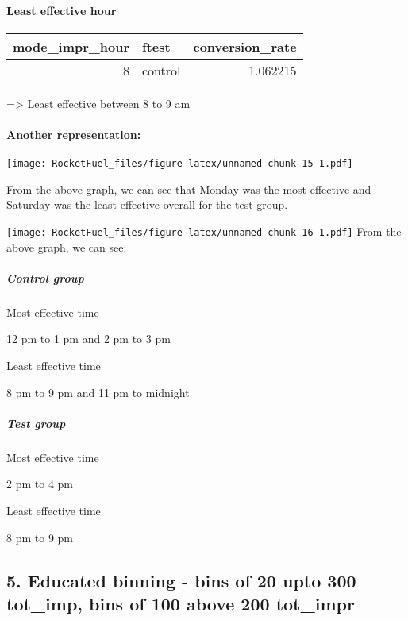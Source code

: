 \documentclass[
]{article}
\begin{document}
\hypertarget{least-effective-hour}{%
\paragraph{Least effective hour}\label{least-effective-hour}}

\begin{longtable}[]{@{}rlr@{}}
\toprule
mode\_impr\_hour & ftest & conversion\_rate\tabularnewline
\midrule
\endhead
8 & control & 1.062215\tabularnewline
\bottomrule
\end{longtable}

=\textgreater{} Least effective between 8 to 9 am

\hypertarget{another-representation}{%
\paragraph{Another representation:}\label{another-representation}}

\texttt{[image: RocketFuel\_files/figure-latex/unnamed-chunk-15-1.pdf]}

From the above graph, we can see that Monday was the most effective and
Saturday was the least effective overall for the test group.

\texttt{[image: RocketFuel\_files/figure-latex/unnamed-chunk-16-1.pdf]}
From the above graph, we can see:

\hypertarget{control-group}{%
\subparagraph{Control group}\label{control-group}}

Most effective time

12 pm to 1 pm and 2 pm to 3 pm

Least effective time

8 pm to 9 pm and 11 pm to midnight

\hypertarget{test-group}{%
\subparagraph{Test group}\label{test-group}}

Most effective time

2 pm to 4 pm

Least effective time

8 pm to 9 pm

\hypertarget{educated-binning---bins-of-20-upto-300-tot_imp-bins-of-100-above-200-tot_impr}{%
\subsection{5. Educated binning - bins of 20 upto 300 tot\_imp, bins of
100 above 200
tot\_impr}\label{educated-binning---bins-of-20-upto-300-tot_imp-bins-of-100-above-200-tot_impr}}
\end{document}
